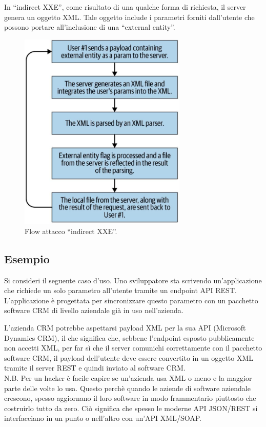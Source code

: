 In ``indirect XXE'', come risultato di una qualche forma
di richiesta, il server genera un oggetto XML. Tale oggetto include i parametri forniti dall'utente che possono portare all'inclusione di una ``external entity''.

\begin{figure}[H]
	\centering
	\includegraphics[width=8cm, keepaspectratio]{capitoli/web_security/imgs/indirect_xxe_flow.png}
	\caption{Flow attacco ``indirect XXE''.}
	\label{fig:indirect_xxe_flow}
\end{figure}

\newpage

\subsection{Esempio}

Si consideri il seguente caso d'uso. Uno sviluppatore sta scrivendo un'applicazione che richiede un solo parametro all'utente tramite un endpoint API REST. L'applicazione è progettata per sincronizzare questo parametro con un pacchetto software CRM di livello aziendale già in uso nell'azienda.

L'azienda CRM potrebbe aspettarsi payload XML per la sua API (Microsoft Dynamics CRM), il che significa che, sebbene l'endpoint esposto pubblicamente non accetti XML, per far sì che il server comunichi correttamente con il pacchetto software CRM, il payload dell'utente deve essere convertito in un oggetto XML tramite il server REST e quindi inviato al software CRM.\\

N.B. Per un hacker è facile capire se un'azienda usa XML o meno e la maggior parte delle volte lo usa. Questo perchè quando le aziende di software aziendale crescono, spesso aggiornano il loro software in modo frammentario piuttosto che costruirlo tutto da zero. Ciò significa che spesso le moderne API JSON/REST si interfacciano in un punto o nell'altro con un'API XML/SOAP.